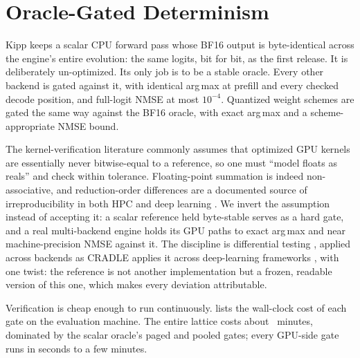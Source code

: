 \documentclass[sigconf,nonacm,screen]{acmart}
\begin{document}
\section{Oracle-Gated Determinism}
\label{sec:oracle}
Kipp keeps a scalar CPU forward pass whose BF16 output is byte-identical
across the engine's entire evolution: the same logits, bit for bit, as the
first release. It is deliberately un-optimized. Its only job is to be a
stable oracle. Every other backend is gated against it, with identical
arg\,max at prefill and every checked decode position, and full-logit NMSE
at most $10^{-4}$. Quantized weight schemes are gated the same way against
the BF16 oracle, with exact arg\,max and a scheme-appropriate NMSE bound.

The kernel-verification literature commonly assumes that optimized GPU
kernels are essentially never bitwise-equal to a reference, so one must
``model floats as reals'' and check within tolerance. Floating-point
summation is indeed non-associative, and reduction-order differences are a
documented source of irreproducibility in both HPC and deep learning
\citep{shanmugavelu2024fpna}. We invert the assumption instead of accepting
it: a scalar reference held byte-stable serves as a hard gate, and a real
multi-backend engine holds its GPU paths to exact arg\,max and near
machine-precision NMSE against it. The discipline is differential testing
\citep{mckeeman1998differential}, applied across backends as CRADLE applies
it across deep-learning frameworks \citep{pham2019cradle}, with one twist:
the reference is not another implementation but a frozen, readable version
of this one, which makes every deviation attributable.

Verification is cheap enough to run continuously.  lists
the wall-clock cost of each gate on the evaluation machine. The entire
lattice costs about \GateCostTotalMinutes{}~minutes, dominated by the scalar
oracle's paged and pooled gates; every GPU-side gate runs in seconds to a
few minutes.
\end{document}
